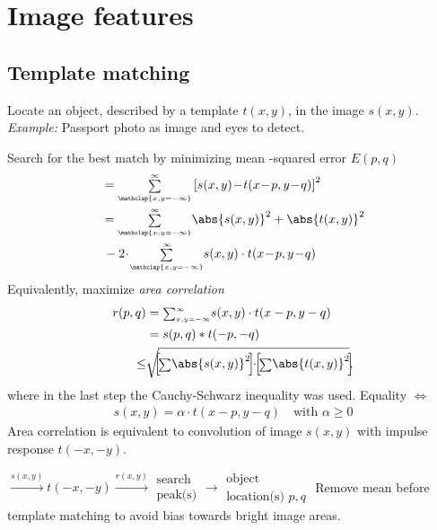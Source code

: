 \chapter{Image features}
\section{Template matching}
\begin{compactdesc}
	\item[\lp{Problem}] Locate an object, described by a template $t(x,y)$, in the image $s(x,y)$. \emph{Example:} Passport photo as image and eyes to detect.
	\item[\lp{Method}] Search for the best match by minimizing mean -squared error $E(p,q)$
		\begin{align*}\scriptscriptstyle
			&={\scriptstyle\sum\limits_{\mathclap{x,y=-\infty}}^{\infty}}\left[ s(x,y)\!-\!t(x\!-\!p,y\!-\!q) \right]^2\\
			&={\scriptstyle\sum\limits_{\mathclap{x,y=-\infty}}^{\infty}}\abs{s(x,y)}^2+\abs{t(x,y)}^2\\
			&\,-2\!\cdot\!{\scriptstyle\sum\limits_{\mathclap{x,y=-\infty}}^{\infty}}s(x,y)\cdot t(x\!-\!p,y\!-\!q)
		\end{align*}
		Equivalently, maximize \emph{area correlation}
		\begin{align*}
			r(p,q)&={\scriptstyle\sum_{x,y=-\infty}^{\infty}}s(x,y)\cdot t(x-p,y-q)\\
			&=s(p,q)*t(-p,-q)\\
			\!\!\!\!\leq&\sqrt{\!\!\left[\! {\scriptstyle\sum} \abs{s(x,y)}^2 \!\right]\!\!\cdot\!\!\left[\! {\scriptstyle\sum} \abs{t(x,y)}^2 \!\right]\!\!},
		\end{align*}
		where in the last step the Cauchy-Schwarz inequality was used. Equality $\Leftrightarrow$
		\begin{gather*}
			s(x,y)=\alpha\cdot t(x-p,y-q)\quad \text{with }\alpha\geq0
		\end{gather*}
		Area correlation is equivalent to convolution of image $s(x,y)$ with impulse response $t(-x,-y)$. 
	\item[\lp{Diagram of template matcher}] $\xrightarrow{s(x,y)}t(-x,-y)\xrightarrow{r(x,y)}\displaystyle
		\begin{matrix}
			\text{search}\\
			\text{peak(s)}
		\end{matrix}
		\to
		\begin{matrix}
			\text{object}\\
			\text{location(s) }p,q
		\end{matrix}
		$ Remove mean before template matching to avoid bias towards bright image areas.
\end{compactdesc}
